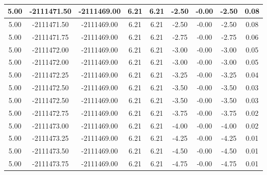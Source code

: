 \begin{table}[htbp]
\begin{adjustbox}{angle=90}
\begin{tabular}{|c|c|c|c|c|c|c|c|c|}
 5.00 & -2111471.50 & -2111469.00 & 6.21 & 6.21 & -2.50 & -0.00 & -2.50 & 0.08\\ \hline
 5.00 & -2111471.50 & -2111469.00 & 6.21 & 6.21 & -2.50 & -0.00 & -2.50 & 0.08\\ \hline
 5.00 & -2111471.75 & -2111469.00 & 6.21 & 6.21 & -2.75 & -0.00 & -2.75 & 0.06\\ \hline
 5.00 & -2111472.00 & -2111469.00 & 6.21 & 6.21 & -3.00 & -0.00 & -3.00 & 0.05\\ \hline
 5.00 & -2111472.00 & -2111469.00 & 6.21 & 6.21 & -3.00 & -0.00 & -3.00 & 0.05\\ \hline
 5.00 & -2111472.25 & -2111469.00 & 6.21 & 6.21 & -3.25 & -0.00 & -3.25 & 0.04\\ \hline
 5.00 & -2111472.50 & -2111469.00 & 6.21 & 6.21 & -3.50 & -0.00 & -3.50 & 0.03\\ \hline
 5.00 & -2111472.50 & -2111469.00 & 6.21 & 6.21 & -3.50 & -0.00 & -3.50 & 0.03\\ \hline
 5.00 & -2111472.75 & -2111469.00 & 6.21 & 6.21 & -3.75 & -0.00 & -3.75 & 0.02\\ \hline
 5.00 & -2111473.00 & -2111469.00 & 6.21 & 6.21 & -4.00 & -0.00 & -4.00 & 0.02\\ \hline
 5.00 & -2111473.25 & -2111469.00 & 6.21 & 6.21 & -4.25 & -0.00 & -4.25 & 0.01\\ \hline
 5.00 & -2111473.50 & -2111469.00 & 6.21 & 6.21 & -4.50 & -0.00 & -4.50 & 0.01\\ \hline
 5.00 & -2111473.75 & -2111469.00 & 6.21 & 6.21 & -4.75 & -0.00 & -4.75 & 0.01\\ \hline
            \end{tabular}
        \end{adjustbox}
        \caption{}
        \label{}
    \end{table}
    